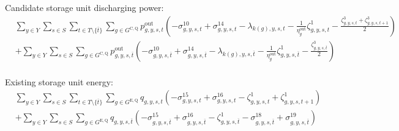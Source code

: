 \documentclass{article}
\newcommand{\sStorageExisting}{G^{\mathrm{E,Q}}}
\newcommand{\sStorageCandidate}{G^{\mathrm{C,Q}}}
\newcommand{\sYears}{Y}
\newcommand{\sScenarios}{S}
\newcommand{\sIntervals}{T}
\newcommand{\iGenerator}{g}
\newcommand{\iYear}{y}
\newcommand{\iScenario}{s}
\newcommand{\iInterval}{t}
\newcommand{\iIntervalTerminal}{\overline{\iInterval}}
\newcommand{\iZone}{z}
\newcommand{\cStorageUnitEfficiencyDischarging}{\eta_{\iGenerator}^{\mathrm{out}}}
\newcommand{\vPowerOut}[1][\iGenerator,\iYear,\iScenario,\iInterval]{p^{\mathrm{out}}_{#1}}
\newcommand{\vStorageUnitEnergy}[1][\iGenerator,\iYear,\iScenario,\iInterval]{q_{#1}}
\newcommand{\dNonNegativeDischarging}[1][\iGenerator,\iYear,\iScenario,\iInterval]{\sigma_{#1}^{10}}
\newcommand{\dMaxDischargingRateCandidate}[1][\iGenerator,\iYear,\iScenario,\iInterval]{\sigma_{#1}^{14}}
\newcommand{\dNonNegativeStorageEnergy}[1][\iGenerator,\iYear,\iScenario,\iInterval]{\sigma_{#1}^{15}}
\newcommand{\dMaxStorageEnergyExisting}[1][\iGenerator,\iYear,\iScenario,\iInterval]{\sigma_{#1}^{16}}
\newcommand{\dMinStorageEnergyIntervalEnd}[1][\iGenerator,\iYear,\iScenario,\iInterval]{\sigma_{#1}^{18}}
\newcommand{\dMaxStorageEnergyIntervalEnd}[1][\iGenerator,\iYear,\iScenario,\iInterval]{\sigma_{#1}^{19}}
\newcommand{\dPowerBalance}[1][\iZone,\iYear,\iScenario,\iInterval]{\lambda_{#1}}
\newcommand{\dStorageEnergyTransition}[1][\iGenerator,\iYear,\iScenario,\iInterval]{\zeta_{#1}^{1}}
\newcommand{\dStorageEnergyOutput}[1][\iGenerator,\iYear,\iScenario,\iInterval]{\zeta_{#1}^{3}}
\begin{document}
Candidate storage unit discharging power:
\begin{align}
	& \sum\limits_{\iYear \in \sYears}\sum\limits_{\iScenario \in \sScenarios} \sum\limits_{\iInterval \in \sIntervals \setminus \{\iIntervalTerminal\}} \sum\limits_{\iGenerator \in \sStorageCandidate} \vPowerOut \left( - \dNonNegativeDischarging + \dMaxDischargingRateCandidate - \dPowerBalance[k(\iGenerator),\iYear,\iScenario,\iInterval] - \frac{1}{\cStorageUnitEfficiencyDischarging} \dStorageEnergyTransition - \frac{\dStorageEnergyOutput + \dStorageEnergyOutput[\iGenerator,\iYear,\iScenario,\iInterval+1]}{2}\right) \nonumber\\
	& + \sum\limits_{\iYear \in \sYears}\sum\limits_{\iScenario \in \sScenarios} \sum\limits_{\iGenerator \in \sStorageCandidate} \vPowerOut[\iGenerator,\iYear,\iScenario,\iIntervalTerminal] \left( - \dNonNegativeDischarging[\iGenerator,\iYear,\iScenario,\iIntervalTerminal] + \dMaxDischargingRateCandidate[\iGenerator,\iYear,\iScenario,\iIntervalTerminal] - \dPowerBalance[k(\iGenerator),\iYear,\iScenario,\iIntervalTerminal] - \frac{1}{\cStorageUnitEfficiencyDischarging} \dStorageEnergyTransition[\iGenerator,\iYear,\iScenario,\iIntervalTerminal] - \frac{\dStorageEnergyOutput[\iGenerator,\iYear,\iScenario,\iIntervalTerminal]}{2}\right)\\\nonumber
\end{align}

Existing storage unit energy:
\begin{align}
	& \sum\limits_{\iYear \in \sYears}\sum\limits_{\iScenario \in \sScenarios} \sum\limits_{\iInterval \in \sIntervals \setminus \{\iIntervalTerminal\}} \sum\limits_{\iGenerator \in \sStorageExisting} \vStorageUnitEnergy \left(- \dNonNegativeStorageEnergy + \dMaxStorageEnergyExisting - \dStorageEnergyTransition + \dStorageEnergyTransition[\iGenerator,\iYear,\iScenario,\iInterval+1] \right)\\
	& + \sum\limits_{\iYear \in \sYears}\sum\limits_{\iScenario \in \sScenarios}\sum\limits_{\iGenerator \in \sStorageExisting} \vStorageUnitEnergy[\iGenerator,\iYear,\iScenario,\iIntervalTerminal] \left(- \dNonNegativeStorageEnergy[\iGenerator,\iYear,\iScenario,\iIntervalTerminal] + \dMaxStorageEnergyExisting[\iGenerator,\iYear,\iScenario,\iIntervalTerminal] - \dStorageEnergyTransition[\iGenerator,\iYear,\iScenario,\iIntervalTerminal] - \dMinStorageEnergyIntervalEnd[\iGenerator,\iYear,\iScenario,\iIntervalTerminal] + \dMaxStorageEnergyIntervalEnd[\iGenerator,\iYear,\iScenario,\iIntervalTerminal] \right)\\
\end{align}
\end{document}
